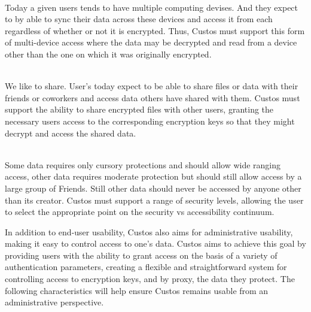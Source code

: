 \begin{packed_desc}
\item[Multi-Device Support] \hfill \\ Today a given users tends to
  have multiple computing devises. And they expect to by able to sync
  their data across these devices and access it from each regardless
  of whether or not it is encrypted. Thus, Custos must support this
  form of multi-device access where the data may be decrypted and read
  from a device other than the one on which it was originally
  encrypted.
\item[Multi-User Support] \hfill \\ We like to share. User's today
  expect to be able to share files or data with their friends or
  coworkers and access data others have shared with them. Custos must
  support the ability to share encrypted files with other users,
  granting the necessary users access to the corresponding encryption
  keys so that they might decrypt and access the shared data.
\item[Flexible Protection Semantics] \hfill \\ Some data requires only
  cursory protections and should allow wide ranging access, other data
  requires moderate protection but should still allow access by a
  large group of Friends. Still other data should never be accessed by
  anyone other than its creator. Custos must support a range of
  security levels, allowing the user to select the appropriate point
  on the security vs accessibility continuum.
\end{packed_desc}

In addition to end-user usability, Custos also aims for administrative
usability, making it easy to control access to one's data. Custos aims
to achieve this goal by providing users with the ability to grant
access on the basis of a variety of authentication parameters,
creating a flexible and straightforward system for controlling access
to encryption keys, and by proxy, the data they protect. The following
characteristics will help ensure Custos remains usable from an
administrative perspective.

